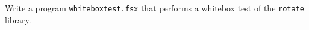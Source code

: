 Write a program \lstinline{whiteboxtest.fsx} that performs a whitebox test of the \lstinline{rotate} library.
